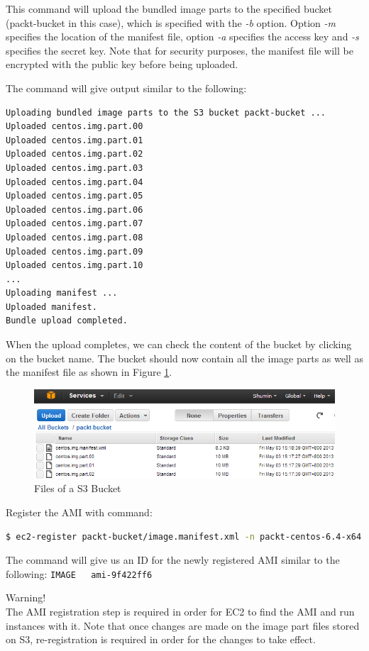 This command will upload the bundled image parts to the specified bucket (packt-bucket in this case), which is specified with the \emph{-b} option. Option \emph{-m} specifies the location of the manifest file, option \emph{-a} specifies the access key and \emph{-s} specifies the secret key. Note that for security purposes, the manifest file will be encrypted with the public key before being uploaded.

The command will give output similar to the following:
\lstset{style=bashstyle}
\begin{lstlisting}
Uploading bundled image parts to the S3 bucket packt-bucket ...
Uploaded centos.img.part.00
Uploaded centos.img.part.01
Uploaded centos.img.part.02
Uploaded centos.img.part.03
Uploaded centos.img.part.04
Uploaded centos.img.part.05
Uploaded centos.img.part.06
Uploaded centos.img.part.07
Uploaded centos.img.part.08
Uploaded centos.img.part.09
Uploaded centos.img.part.10
...
Uploading manifest ...
Uploaded manifest.
Bundle upload completed.
\end{lstlisting}

When the upload completes, we can check the content of the bucket by clicking on the bucket name. The bucket should now contain all the image parts as well as the manifest file as shown in Figure \ref{fig:aws.bucket.content}.
\begin{figure}[ht]
  \centering
  \includegraphics[width=.8\textwidth]{figs/5163os_08_20.png}
  \caption{Files of a S3 Bucket}\label{fig:aws.bucket.content}
\end{figure} 
Register the AMI with command:
\lstset{style=bashstyle}
\begin{lstlisting}[language=bash]
$ ec2-register packt-bucket/image.manifest.xml -n packt-centos-6.4-x64 -O AKIAJ7GAQT52MZKJA4WQ -W QDHHZ0/Mj5pDYFWKpqEzXhwjqM1UB+cqjGQQ6l3S
\end{lstlisting}

The command will give us an ID for the newly registered AMI similar to the following:
\verb|IMAGE   ami-9f422ff6|
\begin{warning}
Warning!\\
The AMI registration step is required in order for EC2 to find the AMI and run instances with it. Note that once changes are made on the image part files stored on S3, re-registration is required in order for the changes to take effect.
\end{warning}

